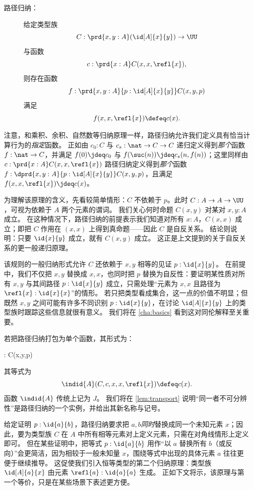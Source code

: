 \begin{description}
\item[路径归纳：] 
  给定类型族
  \[ C : \prd{x,y:A} (\id[A]{x}{y}) \to \UU \]
  与函数
  \[ c :  \prd{x:A} C(x,x,\refl{x}),\]
  则存在函数
  \[ f : \prd{x,y:A}{p:\id[A]{x}{y}} C(x,y,p) \]
  满足
  \[ f(x,x,\refl{x}) \defeq c(x). \]
\end{description}

注意，和乘积、余积、自然数等归纳原理一样，路径归纳允许我们定义具有恰当计算行为的\emph{指定}函数。
正如由 $c_0:C$ 与 $c_s:\nat \to C \to C$ 递归定义得到\emph{那个}函数 $f:\nat\to C$，并满足 $f(0)\jdeq c_0$ 与 $f(\suc(n))\jdeq c_s(n,f(n))$；这里同样由 $c :  \prd{x:A} C(x,x,\refl{x})$ 路径归纳定义得到\emph{那个}函数 $f : \dprd{x,y:A}{p:\id[A]{x}{y}} C(x,y,p)$，且满足 $f(x,x,\refl{x}) \jdeq c(x)$。

为理解该原理的含义，先看较简单情形：$C$ 不依赖于 $p$。此时 $C:A\to A\to \UU$，可视为依赖于 $A$ 两个元素的谓词。
我们关心何时命题 $C(x,y)$ 对某对 $x,y:A$ 成立。
在这种情况下，路径归纳的前提表示我们知道对所有 $x:A$，$C(x,x)$ 成立；即把 $C$ 作用在 $(x,x)$ 上得到真命题——因此 $C$ 是自反关系。
结论则说明：只要 $\id{x}{y}$ 成立，就有 $C(x,y)$ 成立。
这正是上文提到的关于自反关系的更一般递归原理。

该规则的一般归纳形式允许 $C$ 还依赖于 $x,y$ 相等的见证 $p:\id{x}{y}$。
在前提中，我们不仅把 $x,y$ 替换成 $x,x$，也同时把 $p$ 替换为自反性：要证明某性质对所有 $x,y$ 与其间路径 $p : \id{x}{y}$ 成立，只需处理“元素为 $x,x$ 且路径为 $\refl{x}: \id{x}{x}$”的情形。
若只把类型看成集合，这一点的价值不明显；但既然 $x,y$ 之间可能有许多不同识别 $p : \id{x}{y}$，在讨论 $\id[A]{x}{y}$ 上的类型族时跟踪这些信息就很有意义。
我们将在 \cref{cha:basics} 看到这对同伦解释至关重要。

若把路径归纳打包为单个函数，其形式为：
%
\begin{narrowmultline*}
   :  
   \to 
  \narrowbreak
     C(x,y,p)
\end{narrowmultline*}
其等式为
\[ \indid{A}(C,c,x,x,\refl{x}) \defeq c(x). \]
函数 $ \indid{A}$ 传统上记为 $J$。
%
我们将在 \cref{lem:transport} 说明“同一者不可分辨性”是路径归纳的一个实例，并给出其新名称与记号。

\mentalpause

给定证明 $p : \id{a}{b}$，路径归纳要求把 $a,b$\emph{同时}替换成同一个未知元素 $x$；因此，要为类型族 $C$ 在 $A$ 中所有相等元素对上定义元素，只需在对角线情形上定义即可。
但在某些证明中，把等式 $p : \id{a}{b}$ 用作“以 $a$ 替换所有 $b$（或反向）”会更简洁，因为相较于一般未知量 $x$，围绕等式中出现的具体元素 $a$ 往往更便于继续推导。
这促使我们引入恒等类型的第二个归纳原理：类型族 $\id[A]{a}{x}$ 由元素 $\refl{a} : \id{a}{a}$ 生成。
正如下文将示，该原理与第一个等价，只是在某些场景下表述更方便。

